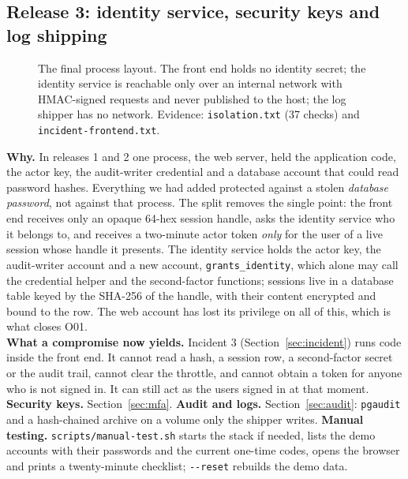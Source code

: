 \documentclass[10pt,a4paper]{article}
\newcommand{\code}[1]{\nolinkurl{#1}}
\newcommand{\diagram}[3]{\begin{figure}[!htbp]\centering\adjustbox{max width=\linewidth,max height=6.6cm}{}\caption{#2}\label{fig:#3}\end{figure}}
\begin{document}
\subsection{Release 3: identity service, security keys and log shipping}\label{sec:split}
\diagram{split}{The final process layout. The front end holds no identity secret; the identity service is reachable only over an internal network with HMAC-signed requests and never published to the host; the log shipper has no network. Evidence: \code{isolation.txt} (37 checks) and \code{incident-frontend.txt}.}{split}
\textbf{Why.} In releases 1 and 2 one process, the web server, held the application code, the actor key, the audit-writer credential and a database account that could read password hashes. Everything we had added protected against a stolen \emph{database password}, not against that process. The split removes the single point: the front end receives only an opaque 64-hex session handle, asks the identity service who it belongs to, and receives a two-minute actor token \emph{only} for the user of a live session whose handle it presents. The identity service holds the actor key, the audit-writer account and a new account, \code{grants\_identity}, which alone may call the credential helper and the second-factor functions; sessions live in a database table keyed by the SHA-256 of the handle, with their content encrypted and bound to the row. The web account has lost its privilege on all of this, which is what closes O01.\\
\textbf{What a compromise now yields.} Incident 3 (Section~\ref{sec:incident}) runs code inside the front end. It cannot read a hash, a session row, a second-factor secret or the audit trail, cannot clear the throttle, and cannot obtain a token for anyone who is not signed in. It can still act as the users signed in at that moment.\\
\textbf{Security keys.} Section~\ref{sec:mfa}. \textbf{Audit and logs.} Section~\ref{sec:audit}: \code{pgaudit} and a hash-chained archive on a volume only the shipper writes. \textbf{Manual testing.} \code{scripts/manual-test.sh} starts the stack if needed, lists the demo accounts with their passwords and the current one-time codes, opens the browser and prints a twenty-minute checklist; \code{--reset} rebuilds the demo data.
\end{document}
